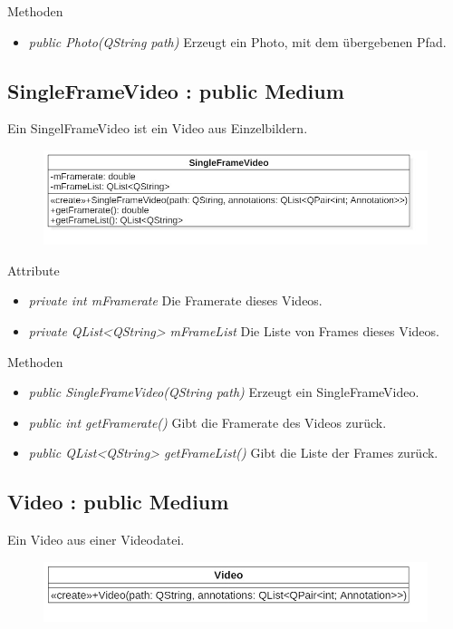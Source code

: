 Methoden
\begin{itemize}
\item \textit{public Photo(QString path)} Erzeugt ein Photo, mit dem übergebenen Pfad.
\end{itemize}

\subsection*{SingleFrameVideo : public Medium}
Ein SingelFrameVideo ist ein Video aus Einzelbildern.

\begin{figure}[H]
\centering
\includegraphics[scale=0.5]{img/Klassendiagramm/Klassen/SingleFrameVideo}
\label{fig:singleFrameVideo}
\end{figure}

Attribute
\begin{itemize}
\item\textit{private int mFramerate} Die Framerate dieses Videos.
\item\textit{private QList<QString> mFrameList} Die Liste von Frames dieses Videos.
\end{itemize}

Methoden
\begin{itemize}
\item \textit{public SingleFrameVideo(QString path)} Erzeugt ein SingleFrameVideo.
\item \textit{public int getFramerate()} Gibt die Framerate des Videos zurück.
\item \textit{public QList<QString> getFrameList()} Gibt die Liste der Frames zurück.
\end{itemize}

\subsection*{Video : public Medium}
Ein Video aus einer Videodatei.

\begin{figure}[H]
\centering
\includegraphics[scale=0.5]{img/Klassendiagramm/Klassen/Video}
\label{fig:video}
\end{figure}

